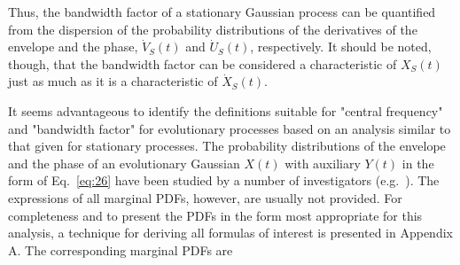 \documentclass{article}
\begin{document}
Thus, the bandwidth factor of a stationary Gaussian process can be quantified
from the dispersion of the probability distributions of the derivatives of the
envelope and the phase, $\dot{V}_S (t)$ and $\dot{U}_S (t)$, respectively. It
should be noted, though, that the bandwidth factor can be considered a
characteristic of $X_S (t)$ just as much as it is a characteristic of
$\dot{X}_S (t)$.

It seems advantageous to identify the definitions suitable for "central
frequency" and "bandwidth factor" for evolutionary processes based on an
analysis similar to that given for stationary processes. The probability
distributions of the envelope and the phase of an evolutionary Gaussian $X
(t)$ with auxiliary $Y (t)$ in the form of Eq.~\eqref{eq:26} have been studied
by a number of investigators (e.g.~{\cite{Muscolino1988,Yang1972}}). The
expressions of all marginal PDFs, however, are usually not provided. For
completeness and to present the PDFs in the form most appropriate for this
analysis, a technique for deriving all formulas of interest is presented in
Appendix A. The corresponding marginal PDFs are
\end{document}

